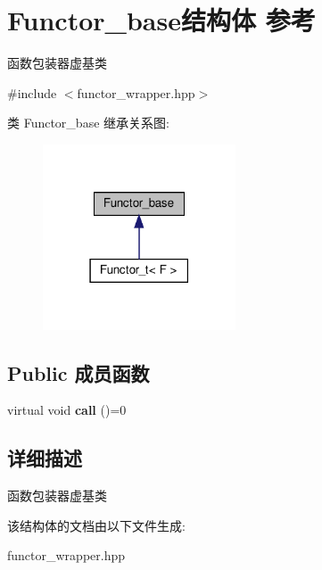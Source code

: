 \hypertarget{structFunctor__base}{}\section{Functor\+\_\+base结构体 参考}
\label{structFunctor__base}


函数包装器虚基类  




{\ttfamily \#include $<$functor\+\_\+wrapper.\+hpp$>$}



类 Functor\+\_\+base 继承关系图\+:
\nopagebreak
\begin{figure}[H]
\begin{center}
\leavevmode
\includegraphics[width=162pt]{structFunctor__base__inherit__graph}
\end{center}
\end{figure}
\subsection*{Public 成员函数}
\begin{DoxyCompactItemize}
\item 
\mbox{\label{structFunctor__base_a249b2f421002975fa78a41ec349e53bf}} 
virtual void {\bfseries call} ()=0
\end{DoxyCompactItemize}


\subsection{详细描述}
函数包装器虚基类 

该结构体的文档由以下文件生成\+:\begin{DoxyCompactItemize}
\item 
functor\+\_\+wrapper.\+hpp\end{DoxyCompactItemize}
